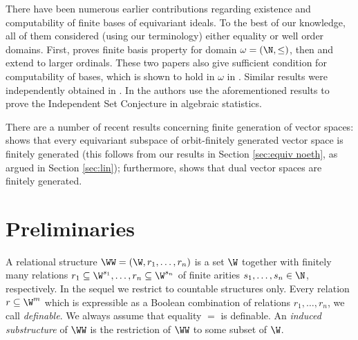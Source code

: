 There have been 
numerous earlier contributions regarding existence and computability of finite bases of equivariant ideals.
To the best of our knowledge, all of them considered 
(using our terminology) either equality or well order domains.
%
First, \cite{Cohen67} proves finite basis property for domain $\omega = (\N, \leq)$, then
\cite{Cohen87} and \cite{Emmott87} extend to larger ordinals.
These two papers also give sufficient condition for computability of \Gr bases,
which is shown to hold in $\omega$ in \cite{HKL18}.
Similar results were independently obtained in \cite{AH07,AH08,BD11}.
In \cite{HS12} the authors use the aforementioned results to prove the Independent Set Conjecture in algebraic statistics.

There are a number of recent results concerning finite generation of vector spaces:
\cite{BKM21} shows that every equivariant subspace of orbit-finitely generated vector space is finitely generated
(this follows from our results in Section \ref{sec:equiv noeth}, as argued in Section \ref{sec:lin});
furthermore, \cite{GHL22} shows that dual vector spaces are finitely generated.

%

\section{Preliminaries}  \label{sec:prelim}



A relational structure $\WW = (\W, r_1, \ldots, r_n)$ 
is a set $\W$ together with finitely many relations 
$r_1\subseteq \W^{s_1}, \ldots, r_n\subseteq \W^{s_n}$ of finite arities $s_1, \ldots, s_n\in\N$, 
respectively.
In the sequel we restrict to countable structures only.
Every relation $r\subseteq \W^m$ which is expressible as a Boolean combination of relations
$r_1, \ldots, r_n$, we call \emph{definable}.
We always assume that equality $=$ is definable.
An \emph{induced substructure} of $\WW$ is the restriction of $\WW$ to some subset of $\W$.

